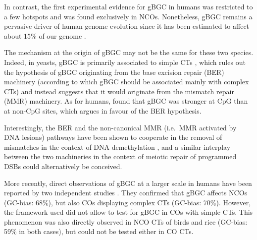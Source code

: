 In contrast, the first experimental evidence for gBGC in humans was restricted to a few hotspots \citep{odenthal-hesse2014transmission,arbeithuber2015crossovers} and was found exclusively in NCOs.
Nonetheless, gBGC remains a pervasive driver of human genome evolution since it has been estimated to affect about 15\% of our genome \citep{pouyet2018background}.\\

\begin{mccorrection}
The mechanism at the origin of gBGC may not be the same for these two species.
Indeed, in yeasts, gBGC is primarily associated to simple CTs \citep{lesecque2013gcbiased}, which rules out the hypothesis of gBGC originating from the base excision repair (BER) machinery (according to which gBGC should be associated mainly with complex CTs) and instead suggests that it would originate from the mismatch repair (MMR) machinery.
As for humans, \citet{halldorsson2016rate} found that gBGC was stronger at CpG than at non-CpG sites, which argues in favour of the BER hypothesis.

Interestingly, the BER and the non-canonical MMR (i.e.\ MMR activated by DNA lesions) pathways have been shown to cooperate in the removal of mismatches in the context of DNA demethylation \citep{grin2016interplay}, and a similar interplay between the two machineries in the context of meiotic repair of programmed DSBs could alternatively be conceived.\\
\end{mccorrection}

More recently, direct observations of gBGC at a larger scale in humans have been reported by two independent studies \citep{williams2015noncrossover, halldorsson2016rate}.
They confirmed that gBGC affects NCOs (GC-bias: 68\%), but also COs displaying complex CTs (GC-bias: 70\%).
However, the framework used did not allow to test for gBGC in COs with simple CTs.
This phenomenon was also directly observed in NCO CTs of birds \citep{smeds2016highresolution} and rice \citep{si2015widely} (GC-bias: 59\% in both cases), but could not be tested either in CO CTs.

